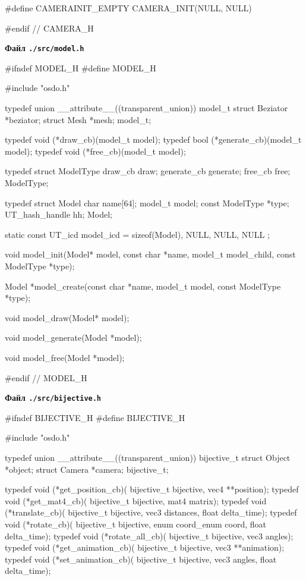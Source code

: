 \begin{multicols}{2}
\begin{ccode}
#define CAMERAINIT_EMPTY CAMERA_INIT(NULL, NULL)

#endif // CAMERA_H
\end{ccode}
\noindent\cprotect\textbf{Файл \verb+./src/model.h+}
\begin{ccode}
#ifndef MODEL_H
#define MODEL_H

#include "osdo.h"

typedef union __attribute__((transparent_union)) model_t {
   struct Beziator *beziator;
   struct Mesh *mesh;
} model_t;

typedef void (*draw_cb)(model_t model);
typedef bool (*generate_cb)(model_t model);
typedef void (*free_cb)(model_t model);

typedef struct ModelType {
    draw_cb draw;
    generate_cb generate;
    free_cb free;
} ModelType;

typedef struct Model {
    char name[64];
    model_t model;
    const ModelType *type;
    UT_hash_handle hh;
} Model;

static const UT_icd model_icd = {
    sizeof(Model), NULL, NULL, NULL
};

void model_init(Model* model, const char *name,
                model_t model_child, const ModelType *type);

Model *model_create(const char *name, model_t model,
                    const ModelType *type);

void model_draw(Model* model);

void model_generate(Model *model);

void model_free(Model *model);

#endif // MODEL_H
\end{ccode}
\noindent\cprotect\textbf{Файл \verb+./src/bijective.h+}
\begin{ccode}
#ifndef BIJECTIVE_H
#define BIJECTIVE_H

#include "osdo.h"

typedef union __attribute__((transparent_union)) bijective_t {
   struct Object *object;
   struct Camera *camera;
} bijective_t;

typedef void (*get_position_cb)(
        bijective_t bijective, vec4 **position);
typedef void (*get_mat4_cb)(
        bijective_t bijective, mat4 matrix);
typedef void (*translate_cb)(
        bijective_t bijective, vec3 distances, float delta_time);
typedef void (*rotate_cb)(
        bijective_t bijective, enum coord_enum coord, float delta_time);
typedef void (*rotate_all_cb)(
        bijective_t bijective, vec3 angles);
typedef void (*get_animation_cb)(
        bijective_t bijective, vec3 **animation);
typedef void (*set_animation_cb)(
        bijective_t bijective, vec3 angles, float delta_time);


\end{ccode}
\end{multicols}

